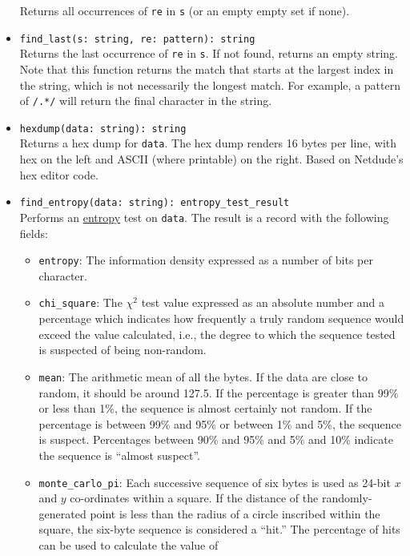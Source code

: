 \documentclass[10pt,landscape]{article}
\begin{document}
\begin{multicols*}{2}
\begin{itemize}
    Returns all occurrences of \texttt{re} in \texttt{s} (or an empty empty set
    if none).
  \item \verb|find_last(s: string, re: pattern): string|\\
    Returns the last occurrence of \texttt{re} in \texttt{s}. If not found,
    returns an empty string.  Note that this function returns the match that
    starts at the largest index in the string, which is not necessarily the
    longest match.  For example, a pattern of \texttt{/.*/} will return the
    final character in the string.
  \item \verb|hexdump(data: string): string|\\
    Returns a hex dump for \texttt{data}. The hex dump renders 16 bytes per
    line, with hex on the left and ASCII (where printable) on the right. Based
    on Netdude's hex editor code.
  \item \verb|find_entropy(data: string): entropy_test_result|\\
    Performs an \href{http://www.fourmilab.ch/random/}{entropy}
    test on \verb|data|. The result is a record with the following fields:
    \begin{itemize}
      \item \verb|entropy|: The information density expressed as a number of
        bits per character.
      \item \verb|chi_square|: The $\chi^2$ test value expressed as an absolute
        number and a percentage which indicates how frequently a truly random
        sequence would exceed the value calculated, i.e., the degree to which
        the sequence tested is suspected of being non-random.
      \item \verb|mean|: The arithmetic mean of all the bytes. If the data are
        close to random, it should be around 127.5.
        If the percentage is greater than 99\% or less than 1\%, the sequence
        is almost certainly not random. If the percentage is between 99\% and
        95\% or between 1\% and 5\%, the sequence is suspect. Percentages
        between 90\% and 95\% and 5\% and 10\% indicate the sequence is
        ``almost suspect''.
      \item \verb|monte_carlo_pi|: Each successive sequence of six bytes is
        used as 24-bit $x$ and $y$ co-ordinates within a square. If the
        distance of the randomly-generated point is less than the radius of a
        circle inscribed within the square, the six-byte sequence is considered
        a ``hit.'' The percentage of hits can be used to calculate the value of

\end{itemize}
\end{itemize}
\end{multicols*}
\end{document}
